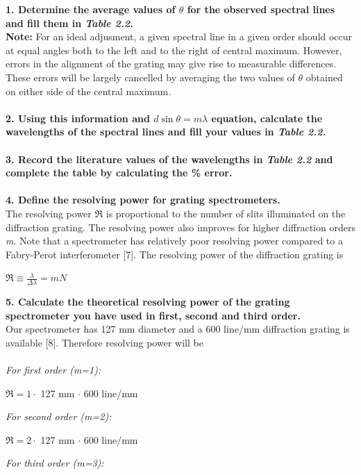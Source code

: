 \documentclass[a4paper,12pt]{report}
\begin{document}
\textbf{1. Determine the average values of $\theta$ for the observed spectral lines and fill them in \textit{Table 2.2.}}\\
\textbf{Note:} For an ideal adjusment, a given spectral line in a given order should occur at equal angles both to the left and to the right of central maximum. However, errors in the alignment of the grating may give rise to measurable differences. These errors will be largely cancelled by averaging the two values of $\theta$ obtained on either side of the central maximum.\\\\
\textbf{2. Using this information and $d\sin\theta=m\lambda$ equation, calculate the wavelengths of the spectral lines and fill your values in \textit{Table 2.2.}}\\\\
\textbf{3. Record the literature values of the wavelengths in \textit{Table 2.2} and complete the table by calculating the \% error.}\\\\
\textbf{4. Define the resolving power for grating spectrometers.}\\
The resolving power $\Re$ is proportional to the number of slits illuminated on the
diffraction grating. The resolving power also improves for higher diffraction
orders \textit{m}. Note that a spectrometer has relatively poor resolving power compared to a Fabry-Perot
interferometer [7]. The resolving
power of the diffraction grating is
\begin{center}
	$\Re \equiv\frac{\lambda}{\Delta\lambda}=mN$
\end{center}
\textbf{5. Calculate the theoretical resolving power of the grating spectrometer you have used in first, second and third order.}\\
Our spectrometer has 127 mm diameter and a 600 line/mm diffraction grating is available [8]. Therefore resolving power will be\\\\
\textit{For first order (m=1):}
\begin{center}
	$\Re=1\cdot$ 127 mm $\cdot$ 600 line/mm\\
\end{center}
\textit{For second order (m=2):}
\begin{center}
	$\Re=2\cdot$ 127 mm $\cdot$ 600 line/mm\\
\end{center}
\textit{For third order (m=3):}
\end{document}

